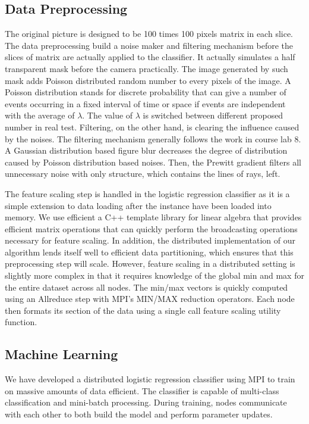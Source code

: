\subsection{Data Preprocessing}

The original picture is designed to be 100 times 100 pixels matrix in each slice. The data preprocessing build a noise maker and filtering mechanism before the slices of matrix are actually applied to the classifier. It actually simulates a half transparent mask before the camera practically. The image generated by such mask adds Poisson distributed random number to every pixels of the image. A Poisson distribution stands for discrete probability that can give a number of events occurring in a fixed interval of time or space if events are independent with the average of $\lambda$. The value of $\lambda$ is switched between different proposed number in real test. Filtering, on the other hand, is clearing the influence caused by the noises. The filtering mechanism generally follows the work in course lab 8. A Gaussian distribution based figure blur decreases the degree of distribution caused by Poisson distribution based noises. Then, the Prewitt gradient filters all unnecessary noise with only structure, which contains the lines of rays, left.

The feature scaling step is handled in the logistic regression classifier as it is a simple extension to data loading after the instance have been loaded into memory.  We use efficient a C++ template library for linear algebra \cite{Eigen} that provides efficient matrix operations that can quickly perform the broadcasting operations necessary for feature scaling.  In addition, the distributed implementation of our algorithm lends itself well to efficient data partitioning, which ensures that this preprocessing step will scale.  However, feature scaling in a distributed setting is slightly more complex in that it requires knowledge of the global min and max for the entire dataset across all nodes.  The min/max vectors is quickly computed using an Allreduce step with MPI's MIN/MAX reduction operators. Each node then formats its section of the data using a single call feature scaling utility function.

\subsection{Machine Learning}
We have developed a distributed logistic regression classifier using MPI to train on massive amounts of data efficient.  The classifier is capable of multi-class classification and mini-batch processing.  During training, nodes communicate with each other to both build the model and perform parameter updates.

